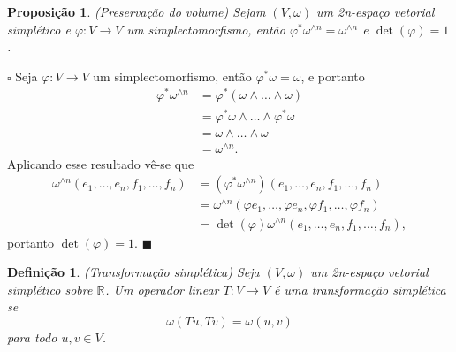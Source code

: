 \documentclass[12pt]{book}
\newtheorem{definicao}[teorema]{Definição}
\newtheorem{proposicao}[teorema]{Proposição}
\newenvironment{prova}[1]{$\square$ #1}{\hfill$\blacksquare$}
\newcommand{\formaSimpletica}[2]{\omega(#1, #2)}
\newcommand{\real}[1]{\mathbb{R}^{#1}}
\newcommand{\reta}{\real{}}
\begin{document}
	\begin{proposicao}\label{proposicao_preservacao_volume}
		(Preservação do volume) Sejam $(V,\omega)$ um 2n-espaço vetorial simplético e $\varphi:V\to V$ um simplectomorfismo, então $\varphi^{*}\omega^{\wedge n}=\omega^{\wedge n}$ e $\det(\varphi)=1$.
	\end{proposicao}
	\begin{prova}
		Seja $\varphi:V \to V$ um simplectomorfismo, então $\varphi^{*}\omega = \omega$, e portanto
		$$
		\begin{aligned}
		\varphi^{*}\omega^{\wedge n} 
		&= 
		\varphi^{*}(\omega\wedge \dots \wedge\omega) 
		\\
		&= \varphi^{*}\omega\wedge \dots \wedge\varphi^{*}\omega
		\\
		&=\omega\wedge \dots \wedge \omega 
		\\
		&= \omega^{\wedge n}.
		\end{aligned} 
		$$
		Aplicando esse resultado vê-se que
		$$
		\begin{aligned}
		\omega^{\wedge n}(e_{1}, \dots,e_{n}, f_{1},\dots, f_{n})
		&=(\varphi^{*}\omega^{\wedge n})(e_{1}, \dots, e_{n}, f_{1},\dots, f_{n})
		\\
		&=
		\omega^{\wedge n}(\varphi e_{1}, \dots,\varphi  e_{n}, \varphi f_{1},\dots, \varphi f_{n})
		\\
		&=\det(\varphi)\omega^{\wedge n}(e_{1}, \dots, e_{n}, f_{1},\dots, f_{n}),
		\end{aligned}
		$$
		portanto $\det(\varphi) = 1$.
	\end{prova}
	
	
	\begin{definicao}\label{definicao_transformacao_simpletica}
		(Transformação simplética) Seja $(V, \omega)$ um 2n-espaço vetorial simplético sobre $\reta$. Um operador linear $T: V \to V$ é uma transformação simplética se 
		$$
		\formaSimpletica{Tu}{Tv} = \formaSimpletica{u}{v}
		$$ para todo $u,v\in V$.
	\end{definicao}
	
\end{document}
